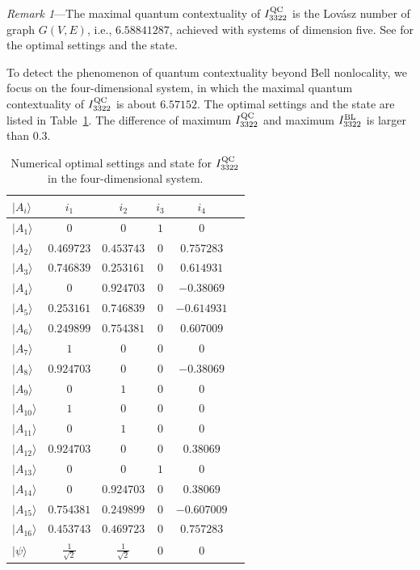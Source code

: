 \documentclass[pra,letterpaper,english,preprint,nofootinbib,aps,superscriptaddress,showkeys]{revtex4-1}
\theoremstyle{definition}
\theoremstyle{remark}
\newcommand{\add}[1]{\textcolor{zhliu}{#1}}
\newcommand\delete{\bgroup\markoverwith{\textcolor{zhliu}{\rule[0.5ex]{2pt}{0.8pt}}}\ULon}
\newcommand{\replace}[2]{\delete{#1}\add{#2}}
\newcommand{\add}[1]{#1}
\newcommand{\delete}[1]{\ignorespaces}
\newcommand{\replace}[2]{#2}
\begin{document}
\emph{Remark 1}---The maximal quantum contextuality of  $I_{3322}^{\rm QC}$  is the Lov\'asz number of graph $G(V,E)$, i.e., $6.58841287$, achieved with systems of dimension five. See \cite{SM} for the \replace{optical}{optimal} settings and the state.


To detect the phenomenon of quantum contextuality beyond Bell nonlocality, we focus on 
 the four-dimensional system, in which the maximal quantum contextuality of $I_{3322}^{\rm QC}$ is about $6.57152.$ The \replace{optical}{optimal} settings and the state are listed in Table~\ref{numerica3}. The difference of maximum  $I_{3322}^{\rm QC}$ and maximum $I_{3322}^{\rm BL}$ is larger than $0.3$.

\begin{table}[htbp]
\centering
  \begin{tabular}{lccccc} \hline \hline
$|A_i\rangle$ & $i_1$ & $i_2$ & $i_3$ & $i_4$  \\
\hline
$|A_1\rangle$ & $0$ & $0$ & $1$ & $0$  \\
$|A_2\rangle$  & $0.469723$ & $0.453743$ & $0$ & $0.757283$  \\
$|A_3\rangle$ & $0.746839$ & $0.253161$ & $0$ & $0.614931$  \\
$|A_4\rangle$  & $0$ & $0.924703$ & $0$ & $-0.38069$  \\
$|A_5\rangle$ & $0.253161$ & $0.746839$ & $0$ & $-0.614931$  \\
$|A_6\rangle$ & $0.249899$ & $0.754381$ & $0$ & $0.607009$  \\
$|A_7\rangle$ & $1$ & $0$ & $0$ & $0$  \\
$|A_8\rangle$  & $0.924703$ & $0$ & $0$ & $-0.38069$  \\
$|A_9\rangle$  & $0$ & $1$ & $0$ & $0$  \\
$|A_{10}\rangle$  & $1$ & $0$ & $0$ & $0$ \\
$|A_{11}\rangle$ & $0$ & $1$ & $0$ & $0$  \\
$|A_{12}\rangle$  & $0.924703$ & $0$ & $0$ & $0.38069$  \\
$|A_{13}\rangle$  & $0$ & $0$ & $1$ & $0$  \\
$|A_{14}\rangle$  & $0$ & $0.924703$ & $0$ & $0.38069$  \\
$|A_{15}\rangle$ & $0.754381$ & $0.249899$ & $0$ & $-0.607009$  \\
$|A_{16}\rangle$  & $0.453743$ & $0.469723$ & $0$ & $0.757283$  \\
\hline
$|\psi\rangle$ & $\frac{1}{\sqrt{2}}$ & $\frac{1}{\sqrt{2}}$ & $0$ & $0$\\
  \hline \hline
   \end{tabular}
\caption{Numerical optimal settings and state for $I_{3322}^{\rm QC}$  in the four-dimensional system.}
\label{numerica3}
\end{table}
\end{document}
